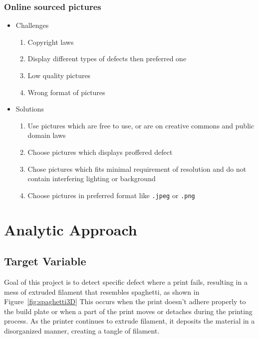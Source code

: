 \documentclass[12pt,a4paper]{article}
\begin{document}
\subsubsection{Online sourced pictures}
\begin{itemize}
    \item Challenges
    \begin{enumerate}
        \item Copyright laws
        \item Display different types of defects then preferred one
        \item Low quality pictures
        \item Wrong format of pictures 
    \end{enumerate}
    \item Solutions
    \begin{enumerate}
        \item Use pictures which are free to use, or are on creative commons and public domain laws 
        \item Choose pictures which displays proffered defect  
        \item Chose pictures which fits minimal requirement of resolution and do not contain interfering lighting or background
        \item Choose pictures in preferred format like \verb|.jpeg| or \verb|.png| 
    \end{enumerate}
\end{itemize}


\section{Analytic Approach}
\subsection{Target Variable}
Goal of this project is to detect specific defect where a print fails, resulting in a mess of extruded filament that resembles spaghetti, as shown in Figure~\ref{fig:spaghetti3D} This occurs when the print doesn't adhere properly to the build plate or when a part of the print moves or detaches during the printing process. As the printer continues to extrude filament, it deposits the material in a disorganized manner, creating a tangle of filament.
\end{document}
